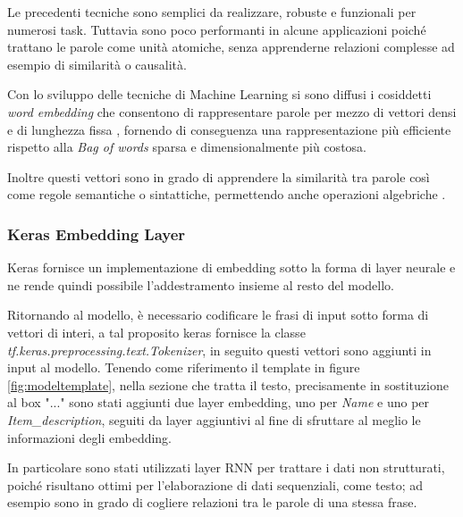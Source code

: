 Le precedenti tecniche sono semplici da realizzare, robuste e funzionali per
numerosi task. Tuttavia sono poco performanti in alcune applicazioni poiché
trattano le parole come unità atomiche, senza apprenderne relazioni complesse
ad esempio di similarità o causalità.

Con lo sviluppo delle tecniche di Machine Learning si sono diffusi i cosiddetti
\textit{word embedding} che consentono di rappresentare parole per mezzo di
vettori densi e di lunghezza fissa \cite{almeida2019word}, fornendo di
conseguenza una rappresentazione più efficiente rispetto alla \textit{Bag of
words} sparsa e dimensionalmente più costosa.

Inoltre questi vettori sono in grado di apprendere la similarità tra parole così
come regole semantiche o sintattiche, permettendo anche operazioni algebriche
\cite{mikolov2013efficient}.

\subsubsection{Keras Embedding Layer}

Keras fornisce un implementazione di embedding sotto la forma di layer neurale e
ne rende quindi possibile l'addestramento insieme al resto del modello.


Ritornando al modello, è necessario codificare le frasi di input sotto forma di
vettori di interi, a tal proposito keras fornisce la classe
\textit{tf.keras.preprocessing.\-text.Tokenizer}, in seguito questi vettori sono
aggiunti in input al modello. Tenendo come riferimento il template in figure
\ref{fig:modeltemplate}, nella sezione che tratta il testo, precisamente in
sostituzione al box "..." sono stati aggiunti due layer embedding, uno per
\textit{Name} e uno per \textit{Item\_description}, seguiti da layer aggiuntivi
al fine di sfruttare al meglio le informazioni degli embedding.

In particolare sono stati utilizzati layer RNN per trattare i dati non
strutturati, poiché risultano ottimi per l'elaborazione di dati sequenziali, come
testo; ad esempio sono in grado di cogliere relazioni tra le parole di una stessa frase.

